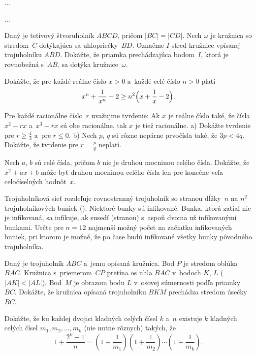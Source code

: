 {%
...}

{%
...}

{%
Daný je tetivový štvoruholník $ABCD$, pričom $|BC|=|CD|$. Nech
$\omega$ je kružnica so stredom~$C$ dotýkajúca sa uhlopriečky~$BD$.
Označme $I$ stred kružnice vpísanej trojuholníku $ABD$. Dokážte, že priamka
prechádzajúca bodom~$I$, ktorá je rovnobežná s~$AB$, sa dotýka kružnice~$\omega$.}

{%
Dokážte, že pre každé reálne číslo $x>0$ a~každé celé číslo $n>0$ platí
$$
x^n+\frac1{x^n}-2\ge n^2\Bigl(x+\frac1x-2\Bigr).
$$
}

{%
Pre každé racionálne číslo~$r$ uvažujme tvrdenie:
Ak $x$ je reálne číslo také, že čísla $x^2-rx$ a~$x^3-rx$ sú obe racionálne, tak $x$ je tiež racionálne.
\ite a) Dokážte tvrdenie pre $r\ge\frac43$ a~pre $r\le 0$.
\ite b) Nech $p$, $q$ sú rôzne nepárne prvočísla také, že $3p<4q$. Dokážte, že tvrdenie pre $r=\frac pq$ neplatí.\endgraf
}

{%
Nech $a$, $b$ sú celé čísla, pričom $b$ nie je druhou mocninou celého čísla.
Dokážte, že $x^2+ax+b$ môže byť druhou mocninou celého čísla len pre konečne veľa celočíselných hodnôt~$x$.}

{%
Trojuholníková sieť rozdeľuje rovnostranný trojuholník so stranou dĺžky~$n$ na
$n^2$ trojuholníkových buniek (\obr). Niektoré bunky sú infikované. Bunka, ktorá zatiaľ nie je infikovaná,
sa infikuje, ak susedí (stranou) s~aspoň dvoma už infikovanými bunkami. Určte pre $n=12$ najmenší možný počet na začiatku infikovaných buniek, pri ktorom je možné, že po čase budú infikované všetky bunky pôvodného trojuholníka.
}

{%
Daný je trojuholník $ABC$ a~jemu opísaná kružnica. Bod $P$ je stredom oblúka $BAC$.
Kružnica s~priemerom~$CP$ pretína os uhla $BAC$ v~bodoch
$K$, $L$ ($|AK|<|AL|$). Bod~$M$ je obrazom bodu $L$ v~osovej súmernosti podľa
priamky~$BC$. Dokážte, že kružnica opísaná trojuholníku $BKM$ prechádza stredom úsečky~$BC$.}

{%
Dokážte, že ku každej dvojici kladných celých čísel $k$ a~$n$ existuje $k$ kladných celých čísel $m_1, m_2, \dots, m_k$ (nie nutne rôznych) takých, že
$$
1+\frac{2^k-1}n = \left(1+\frac1{m_1}\right)\left(1+\frac1{m_2}\right) \cdots \left(1+\frac1{m_k}\right).
$$
}


